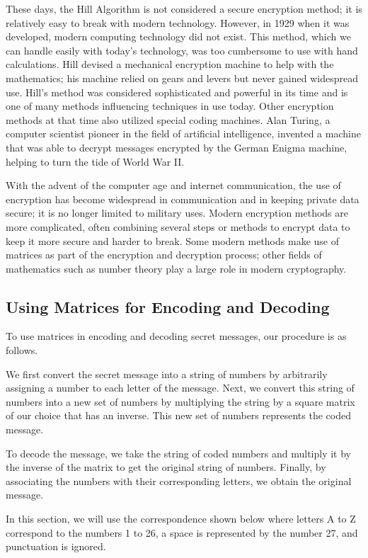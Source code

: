 These days, the Hill Algorithm is not considered a secure encryption method; it is relatively easy to break with modern technology. However, in 1929 when it was developed, modern computing technology did not exist. This method, which we can handle easily with today’s technology, was too cumbersome to use with hand calculations. Hill devised a mechanical encryption machine to help with the mathematics; his machine relied on gears and levers but never gained widespread use. Hill’s method was considered sophisticated and powerful in its time and is one of many methods influencing techniques in use today. Other encryption methods at that time also utilized special coding machines. Alan Turing, a computer scientist pioneer in the field of artificial intelligence, invented a machine that was able to decrypt messages encrypted by the German Enigma machine, helping to turn the tide of World War II.

With the advent of the computer age and internet communication, the use of encryption has become widespread in communication and in keeping private data secure; it is no longer limited to military uses. Modern encryption methods are more complicated, often combining several steps or methods to encrypt data to keep it more secure and harder to break. Some modern methods make use of matrices as part of the encryption and decryption process; other fields of mathematics such as number theory play a large role in modern cryptography.

\subsection{Using Matrices for Encoding and Decoding}

To use matrices in encoding and decoding secret messages, our procedure is as follows.

We first convert the secret message into a string of numbers by arbitrarily assigning a number to each letter of the message. Next, we convert this string of numbers into a new set of numbers by multiplying the string by a square matrix of our choice that has an inverse. This new set of numbers represents the coded message.

To decode the message, we take the string of coded numbers and multiply it by the inverse of the matrix to get the original string of numbers. Finally, by associating the numbers with their corresponding letters, we obtain the original message.

In this section, we will use the correspondence shown below where letters A to Z correspond to the numbers 1 to 26, a space is represented by the number 27, and punctuation is ignored.

